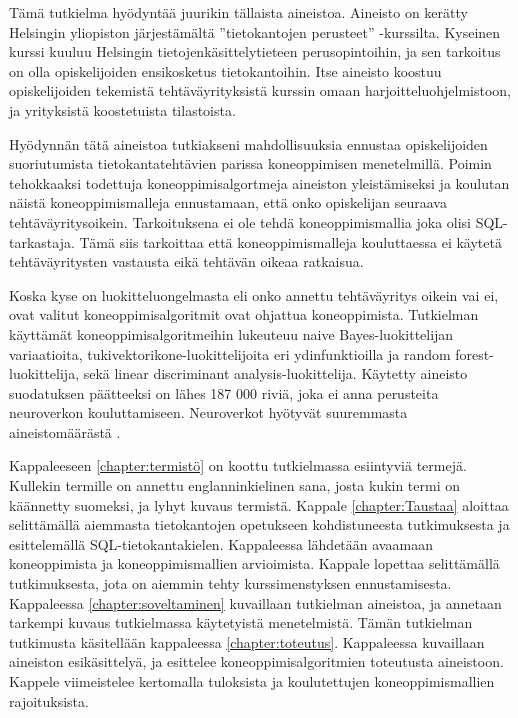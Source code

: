 \documentclass[finnish,twoside,openright]{HYgraduMLDS}
\begin{document}
Tämä tutkielma hyödyntää juurikin tällaista aineistoa. Aineisto on kerätty Helsingin yliopiston järjestämältä ''tietokantojen perusteet'' \cite{tikape2019}-kurssilta. Kyseinen kurssi kuuluu Helsingin tietojenkäsittelytieteen perusopintoihin, ja sen tarkoitus on olla opiskelijoiden ensikosketus tietokantoihin. Itse aineisto koostuu opiskelijoiden tekemistä tehtäväyrityksistä kurssin omaan harjoitteluohjelmistoon, ja yrityksistä koostetuista tilastoista.

Hyödynnän tätä aineistoa tutkiakseni mahdollisuuksia ennustaa opiskelijoiden suoriutumista tietokantatehtävien parissa koneoppimisen menetelmillä. Poimin tehokkaaksi todettuja koneoppimisalgortmeja aineiston yleistämiseksi ja koulutan näistä koneoppimismalleja ennustamaan, että onko opiskelijan seuraava tehtäväyritysoikein. Tarkoituksena ei ole tehdä koneoppimismallia joka olisi SQL-tarkastaja. Tämä siis tarkoittaa että koneoppimismalleja kouluttaessa ei käytetä tehtäväyritysten vastausta eikä tehtävän oikeaa ratkaisua. 

Koska kyse on luokitteluongelmasta eli onko annettu tehtäväyritys oikein vai ei, ovat valitut koneoppimisalgoritmit ovat ohjattua koneoppimista. Tutkielman käyttämät koneoppimisalgoritmeihin lukeuteuu naive Bayes-luokittelijan variaatioita, tukivektorikone-luokittelijoita eri ydinfunktioilla ja random forest-luokittelija, sekä linear discriminant analysis-luokittelija. Käytetty aineisto suodatuksen päätteeksi on lähes 187 000 riviä, joka ei anna perusteita neuroverkon kouluttamiseen. Neuroverkot hyötyvät suuremmasta aineistomäärästä \cite{Castro-Wunsch:2017:ENN:3017680.3017792}.

Kappaleeseen \ref{chapter:termistö} on koottu tutkielmassa esiintyviä termejä. Kullekin termille on annettu englanninkielinen sana, josta kukin termi on käännetty suomeksi, ja lyhyt kuvaus termistä.
Kappale \ref{chapter:Taustaa} aloittaa selittämällä aiemmasta tietokantojen opetukseen kohdistuneesta tutkimuksesta ja esittelemällä SQL-tietokantakielen. Kappaleessa lähdetään avaamaan koneoppimista ja koneoppimismallien arvioimista. Kappale lopettaa selittämällä tutkimuksesta, jota on aiemmin tehty kurssimenstyksen ennustamisesta. 
Kappaleessa \ref{chapter:soveltaminen} kuvaillaan tutkielman aineistoa, ja annetaan tarkempi kuvaus tutkielmassa käytetyistä menetelmistä.
Tämän tutkielman tutkimusta käsitellään kappaleessa \ref{chapter:toteutus}. Kappaleessa kuvaillaan aineiston esikäsittelyä, ja esittelee koneoppimisalgoritmien toteutusta aineistoon. Kappele viimeistelee kertomalla tuloksista ja koulutettujen koneoppimismallien rajoituksista.
\end{document}
